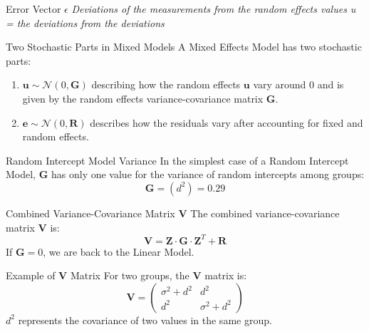 \documentclass{beamer}
\begin{document}
\begin{frame}{Error Vector $\epsilon$}
\large \textit{Deviations of the measurements from the random effects values u = the deviations from the deviations}
\end{frame}

\begin{frame}{Two Stochastic Parts in Mixed Models}
\Large
A Mixed Effects Model has two stochastic parts:
\vspace{0.2cm}

\begin{enumerate}
  \item $\mathbf{u} \sim \mathcal{N}(0, \mathbf{G})$ describing how the random effects $\mathbf{u}$ vary around $0$ and is given by the random effects variance-covariance matrix $\mathbf{G}$.
  \item $\mathbf{e} \sim \mathcal{N}(0, \mathbf{R})$ describes how the residuals vary after accounting for fixed and random effects.
\end{enumerate}
\end{frame}

\begin{frame}{Random Intercept Model Variance}
In the simplest case of a Random Intercept Model, $\mathbf{G}$ has only one value for the variance of random intercepts among groups:
\[
\mathbf{G} = \left( d^2 \right) = 0.29
\]
\end{frame}

\begin{frame}{Combined Variance-Covariance Matrix $\mathbf{V}$}
The combined variance-covariance matrix $\mathbf{V}$ is:
\[
\mathbf{V} = \mathbf{Z} \cdot \mathbf{G} \cdot \mathbf{Z}^T + \mathbf{R}
\]
If $\mathbf{G} = 0$, we are back to the Linear Model.
\end{frame}

\begin{frame}{Example of $\mathbf{V}$ Matrix}
For two groups, the $\mathbf{V}$ matrix is:
\[
\mathbf{V} = \left( 
\begin{array}{cc} 
\sigma^2 + d^2 & d^2 \\ 
d^2 & \sigma^2 + d^2 
\end{array} \right)
\]
$d^2$ represents the covariance of two values in the same group.
\end{frame}
\end{document}
